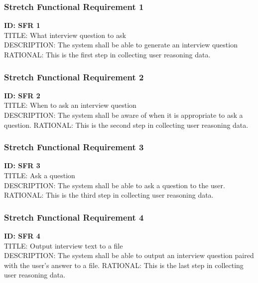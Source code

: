 \documentclass[onecolumn, draftclsnofoot,10pt, compsoc]{IEEEtran}
\begin{document}
        
        \subsubsection{Stretch Functional Requirement 1}
    	\textbf{ID: SFR 1} \\
        TITLE: What interview question to ask \\
        DESCRIPTION: The system shall be able to generate an interview question
        RATIONAL: This is the first step in collecting user reasoning data. \\
        
        
        \subsubsection{Stretch Functional Requirement 2}
    	\textbf{ID: SFR 2} \\
        TITLE: When to ask an interview question \\
        DESCRIPTION: The system shall be aware of when it is appropriate to ask a question.
        RATIONAL: This is the second step in collecting user reasoning data. \\
        
        \subsubsection{Stretch Functional Requirement 3}
    	\textbf{ID: SFR 3} \\
        TITLE: Ask a question \\
        DESCRIPTION: The system shall be able to ask a question to the user.
        RATIONAL: This is the third step in collecting user reasoning data. \\
        
        \subsubsection{Stretch Functional Requirement 4}
    	\textbf{ID: SFR 4} \\
        TITLE: Output interview text to a file \\
        DESCRIPTION: The system shall be able to output an interview question paired with the user's answer to a file.
        RATIONAL: This is the last step in collecting user reasoning data. \\
        
\end{document}
